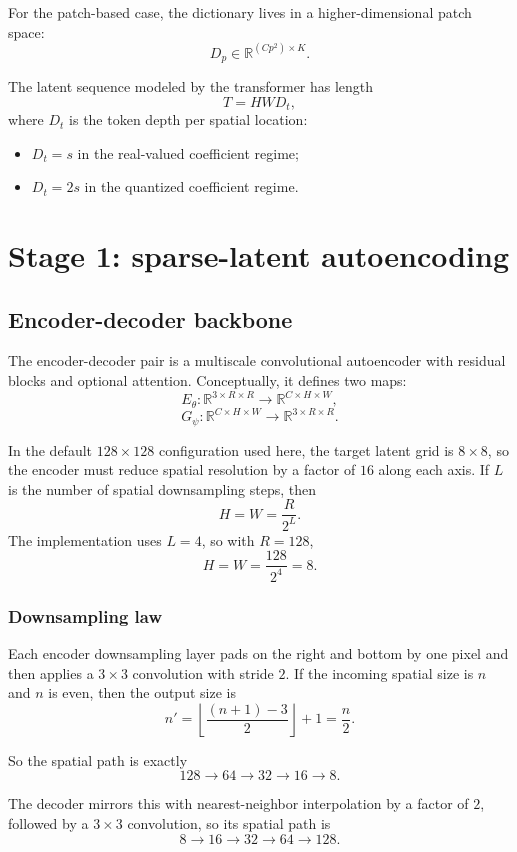 \documentclass[11pt]{article}
\newcommand{\R}{\mathbb{R}}
\begin{document}
For the patch-based case, the dictionary lives in a higher-dimensional patch space:
\[
D_p \in \R^{(C p^2) \times K}.
\]

The latent sequence modeled by the transformer has length
\[
T = H W D_t,
\]
where $D_t$ is the token depth per spatial location:
\begin{itemize}
  \item $D_t = s$ in the real-valued coefficient regime;
  \item $D_t = 2s$ in the quantized coefficient regime.
\end{itemize}

\section{Stage 1: sparse-latent autoencoding}

\subsection{Encoder-decoder backbone}

The encoder-decoder pair is a multiscale convolutional autoencoder with residual blocks and optional attention. Conceptually, it defines two maps:
\[
E_\theta : \R^{3 \times R \times R} \to \R^{C \times H \times W},
\]
\[
G_\psi : \R^{C \times H \times W} \to \R^{3 \times R \times R}.
\]

In the default $128 \times 128$ configuration used here, the target latent grid is $8 \times 8$, so the encoder must reduce spatial resolution by a factor of $16$ along each axis. If $L$ is the number of spatial downsampling steps, then
\[
H = W = \frac{R}{2^L}.
\]
The implementation uses $L = 4$, so with $R = 128$,
\[
H = W = \frac{128}{2^4} = 8.
\]

\subsubsection{Downsampling law}

Each encoder downsampling layer pads on the right and bottom by one pixel and then applies a $3 \times 3$ convolution with stride $2$. If the incoming spatial size is $n$ and $n$ is even, then the output size is
\[
n'
=
\left\lfloor \frac{(n+1)-3}{2} \right\rfloor + 1
=
\frac{n}{2}.
\]

So the spatial path is exactly
\[
128 \to 64 \to 32 \to 16 \to 8.
\]

The decoder mirrors this with nearest-neighbor interpolation by a factor of $2$, followed by a $3 \times 3$ convolution, so its spatial path is
\[
8 \to 16 \to 32 \to 64 \to 128.
\]
\end{document}
